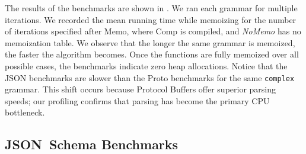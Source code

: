 \documentclass[runningheads]{llncs}
\newcommand{\JSONSchema}{%
  JSON~Schema\xspace%
}
\newcommand{\JSON}{\ac{JSON}\xspace}
\begin{document}
The results of the benchmarks are shown in .
We ran each grammar for multiple iterations.
We recorded the mean running time while memoizing for the number of iterations specified after Memo, where Comp is compiled, and \emph{NoMemo} has no memoization table.
We observe that the longer the same grammar is memoized, the faster the algorithm becomes.
Once the functions are fully memoized over all possible cases, the benchmarks indicate zero heap allocations.
Notice that the \JSON benchmarks are slower than the Proto benchmarks for the same \lstinline{complex} grammar.
This shift occurs because Protocol Buffers offer superior parsing speeds; our profiling confirms that parsing has become the primary CPU bottleneck.

\subsection{\JSONSchema Benchmarks}
\end{document}
